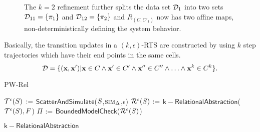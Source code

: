 \begin{figure}[!htbp]
\begin{center}
\begin{tikzpicture}
\end{tikzpicture}
\end{center}
\vspace*{-.3cm}
\caption{The $k=2$ refinement further splits the data set $\ds_1$
    into two sets $\ds_{11} = \setof{\pi_1}$ and $\ds_{12} =
    \setof{\pi_2}$ and $R_{(C,C'_1)}$ now has two affine maps,
    non-deterministically defining the system behavior.}
\label{fig:k2}
\vspace*{-.3cm}
\end{figure}


Basically, the transition updates in a $(k,\epsilon)$-RTS are
constructed by using $k$ step trajectories which have their end points
in the same cells.
\[
    \ds = \setof{(\vx,\vx') | \vx \in C \land \vx' \in C' \land \vx''
    \in C'' \land \ldots \land \vx^k \in C^k }.
\]


\begin{algorithm}[t]
\DontPrintSemicolon
\caption{PW-Rel\label{algo:pwa-rel}}
    $\TSAbstraction{\epsilon}{\System}$ $\assign$ $\mathsf{ScatterAndSimulate}$($\System$,$\simmap_\Delta$,$\epsilon$)  \;
    $\RTSAbstraction{\epsilon}{\System}$ $\assign$
    $\mathsf{k-RelationalAbstraction}$($\TSAbstraction{\epsilon}{\System},
    F$)  \;
    $\Pi$ $\assign$ $\mathsf{BoundedModelCheck}$($\RTSAbstraction{\epsilon}{\System}$)  \;
\end{algorithm}

\begin{algorithm}[t]
\DontPrintSemicolon
    \caption{$\mathsf{k-RelationalAbstraction}$\label{algo:relabs}}
\end{algorithm}
